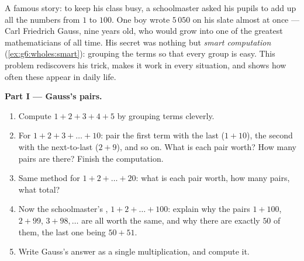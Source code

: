 \begin{problem}
\label{pb:g6:wholes:1}
A famous story: to keep his class busy, a schoolmaster asked his
pupils to add up all the numbers from $1$ to $100$. One boy wrote
$5\,050$ on his slate almost at once --- Carl Friedrich Gauss, nine
years old, who would grow into one of the greatest mathematicians
of all time. His secret was nothing but \emph{smart computation}
(\cref{ex:g6:wholes:smart}): grouping the terms so that every group
is easy. This problem rediscovers his trick, makes it work in every
situation, and shows how often these  appear in daily life.

\medskip
\noindent\textbf{Part I --- Gauss's pairs.}
\begin{enumerate}
  \item Compute $1 + 2 + 3 + 4 + 5$ by grouping terms cleverly.
  \item For $1 + 2 + 3 + \dots + 10$: pair the first term with the
        last ($1 + 10$), the second with the next-to-last
        ($2 + 9$), and so on. What is each pair worth? How many
        pairs are there? Finish the computation.
  \item Same method for $1 + 2 + \dots + 20$: what is each pair
        worth, how many pairs, what total?
  \item Now the schoolmaster's , $1 + 2 + \dots + 100$: explain
        why the pairs $1 + 100$, $2 + 99$, $3 + 98, \dots$ are all
        worth the same, and why there are exactly $50$ of them,
        the last one being $50 + 51$.
  \item Write Gauss's answer as a single multiplication, and
        compute it.
\end{enumerate}


\end{problem}
